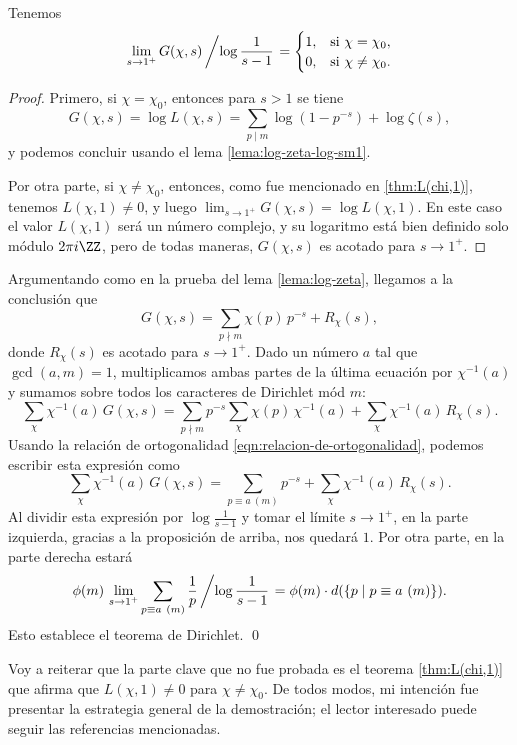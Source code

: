 \begin{proposicion}
  Tenemos
  \[ \lim_{s\to 1^+} G (\chi,s)\left/\log \frac{1}{s-1}\right. =
  \begin{cases}
    1, & \text{si } \chi = \chi_0, \\
    0, & \text{si } \chi \ne \chi_0.
  \end{cases} \]

  \begin{proof}
    Primero, si $\chi = \chi_0$, entonces para $s > 1$ se tiene
    \[ G (\chi,s) = \log L (\chi,s) =
    \sum_{p\mid m} \log (1 - p^{-s}) + \log \zeta (s), \]
    y podemos concluir usando el lema \ref{lema:log-zeta-log-sm1}.

    Por otra parte, si $\chi \ne \chi_0$, entonces, como fue mencionado en
    \ref{thm:L(chi,1)}, tenemos $L (\chi,1) \ne 0$, y luego
    $\lim_{s\to 1^+} G (\chi,s) = \log L (\chi,1)$. En este caso el valor
    $L (\chi,1)$ será un número complejo, y su logaritmo está bien definido solo
    módulo $2\pi i \ZZ$, pero de todas maneras, $G (\chi,s)$ es acotado para
    $s \to 1^+$.
  \end{proof}
\end{proposicion}

Argumentando como en la prueba del lema \ref{lema:log-zeta}, llegamos a la
conclusión que
$$G (\chi,s) = \sum_{p \nmid m} \chi (p)\,p^{-s} + R_\chi (s),$$
donde $R_\chi (s)$ es acotado para $s \to 1^+$. Dado un número $a$ tal que
$\gcd (a,m) = 1$, multiplicamos ambas partes de la última ecuación por
$\chi^{-1} (a)$ y sumamos sobre todos los caracteres de Dirichlet mód $m$:
$$\sum_\chi \chi^{-1} (a)\,G (\chi,s) = \sum_{p \nmid m} p^{-s} \sum_\chi \chi (p)\,\chi^{-1} (a) + \sum_\chi \chi^{-1} (a)\,R_\chi (s).$$
Usando la relación de ortogonalidad \eqref{eqn:relacion-de-ortogonalidad},
podemos escribir esta expresión como
$$\sum_\chi \chi^{-1} (a)\,G (\chi,s) = \sum_{p \equiv a ~ (m)} p^{-s} + \sum_\chi \chi^{-1} (a)\,R_\chi (s).$$
Al dividir esta expresión por $\log \frac{1}{s-1}$ y tomar el límite
$s \to 1^+$, en la parte izquierda, gracias a la proposición de arriba, nos
quedará $1$. Por otra parte, en la parte derecha estará
$$\phi (m)\,\lim_{s\to 1^+} \sum_{p \equiv a ~ (m)} \frac{1}{p} \left/\log \frac{1}{s-1}\right. = \phi (m) \cdot d (\{ p \mid p \equiv a ~ (m) \}).$$
Esto establece el teorema de Dirichlet. \qed

\vspace{1em}

Voy a reiterar que la parte clave que no fue probada es el teorema
\ref{thm:L(chi,1)} que afirma que $L (\chi,1) \ne 0$ para $\chi \ne \chi_0$.
De todos modos, mi intención fue presentar la estrategia general de
la demostración; el lector interesado puede seguir las referencias mencionadas.

